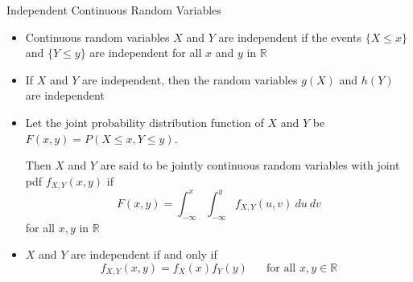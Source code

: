 \documentclass[t]{beamer}
\begin{document}
\begin{frame}{Independent Continuous Random Variables}
  \footnotesize
  \begin{itemize}
    \item \pause Continuous random variables $X$ and $Y$ are independent if the events $\{X \leq x\}$ and $\{Y \leq y\}$ are independent for all $x$ and $y$ in $\mathbb{R}$
    \item \pause If $X$ and $Y$ are independent, then the random variables $g(X)$ and $h(Y)$ are independent
    \item \pause Let the joint probability distribution function of $X$ and $Y$ be $F(x,y) = P(X \leq x, Y \leq y)$.

    \pause Then $X$ and $Y$ are said to be jointly continuous random variables with joint pdf $f_{X,Y}(x,y)$ if
      \begin{equation*}
        F(x,y) = \int_{-\infty}^x \int_{-\infty}^y f_{X,Y}(u,v) \ du\ dv
      \end{equation*}
      for all $x,y$ in $\mathbb{R}$
    \item \pause $X$ and $Y$ are independent if and only if
      \begin{equation*}
        f_{X,Y}(x,y) = f_X(x) f_Y(y) \ \ \ \ \ \ \text{ for all } x,y \in \mathbb{R}
      \end{equation*}
  \end{itemize}
  \normalsize
\end{frame}
\end{document}
